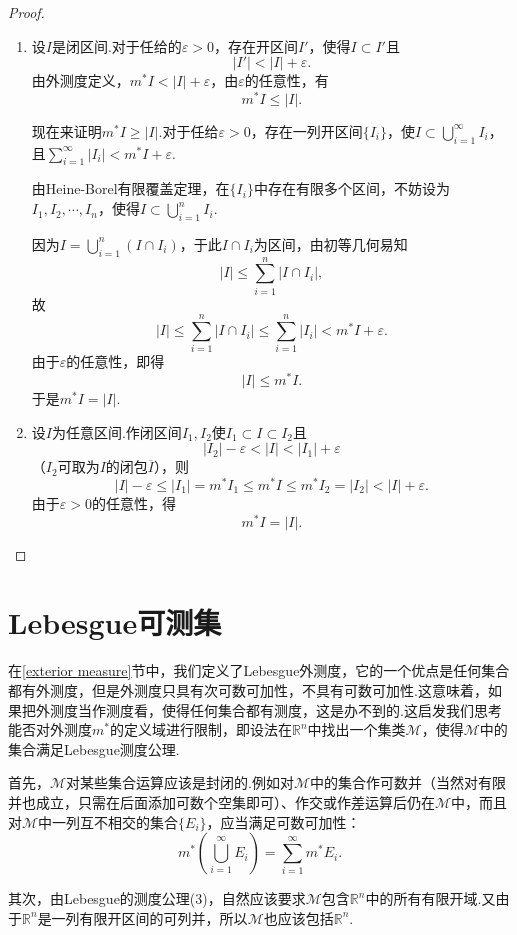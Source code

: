 \documentclass[lang=cn,12pt]{ctexart}
\theoremstyle{definition}
\theoremstyle{plain}
\begin{document}
\begin{proof}
	\begin{enumerate}
		\item 设$I$是闭区间.对于任给的$\varepsilon>0$，存在开区间$I'$，使得$I\subset I'$且
		$$|I'|<|I|+\varepsilon.$$
		由外测度定义，$m^*I<|I|+\varepsilon$，由$\varepsilon$的任意性，有
		$$m^*I\leqslant|I|.$$
		
		现在来证明$m^*I\geqslant |I|$.对于任给$\varepsilon>0$，存在一列开区间$\{I_i\}$，使$I\subset\bigcup\limits_{i=1}^{\infty}I_i$，且$\sum\limits_{i=1}^{\infty}|I_i|<m^*I+\varepsilon$.
		
		由Heine-Borel有限覆盖定理，在$\{I_i\}$中存在有限多个区间，不妨设为$I_1,I_2,\cdots,I_n$，使得$I\subset\bigcup\limits_{i=1}^{n}I_i$.
		
		因为$I=\bigcup\limits_{i=1}^{n}(I\cap I_i)$，于此$I\cap I_i$为区间，由初等几何易知
		$$|I|\leqslant\sum_{i=1}^{n}|I\cap I_i|,$$
		故
		$$|I|\leqslant\sum_{i=1}^{n}|I\cap I_i|\leqslant\sum_{i=1}^{n}|I_i|<m^*I+\varepsilon.$$
		由于$\varepsilon$的任意性，即得
		$$|I|\leqslant m^*I.$$
		于是$m^*I=|I|$.
		\item 设$I$为任意区间.作闭区间$I_1,I_2$使$I_1\subset I\subset I_2$且
		$$|I_2|-\varepsilon<|I|<|I_1|+\varepsilon$$
		（$I_2$可取为$I$的闭包$\overline{I}$），则
		$$|I|-\varepsilon\leqslant|I_1|=m^*I_1\leqslant m^*I\leqslant m^*I_2=|I_2|<|I|+\varepsilon.$$
		由于$\varepsilon>0$的任意性，得
		$$m^*I=|I|.$$
	\end{enumerate}
	
\end{proof}
\section{Lebesgue可测集}
在\ref{exterior measure}节中，我们定义了Lebesgue外测度，它的一个优点是任何集合都有外测度，但是外测度只具有次可数可加性，不具有可数可加性.这意味着，如果把外测度当作测度看，使得任何集合都有测度，这是办不到的.这启发我们思考能否对外测度$m^*$的定义域进行限制，即设法在$\mathbb{R}^n$中找出一个集类$\mathcal{M}$，使得$\mathcal{M}$中的集合满足Lebesgue测度公理.

首先，$\mathcal{M}$对某些集合运算应该是封闭的.例如对$\mathcal{M}$中的集合作可数并（当然对有限并也成立，只需在后面添加可数个空集即可）、作交或作差运算后仍在$\mathcal{M}$中，而且对$\mathcal{M}$中一列互不相交的集合$\{E_i\}$，应当满足可数可加性：
$$m^*\left(\bigcup_{i=1}^{\infty}E_i\right)=\sum_{i=1}^{\infty}m^*E_i.$$

其次，由Lebesgue的测度公理(3)，自然应该要求$\mathcal{M}$包含$\mathbb{R}^n$中的所有有限开域.又由于$\mathbb{R}^n$是一列有限开区间的可列并，所以$\mathcal{M}$也应该包括$\mathbb{R}^n$.
\end{document}
